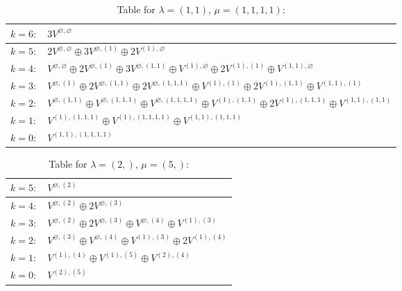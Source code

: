 \documentclass[a4paper,12pt]{article}
\begin{document}
\renewcommand{\arraystretch}{1.6} 
\begin{table}[H]
\centering
\caption{Table for $\lambda = (1, 1)$, $\mu = (1, 1, 1, 1)$:}
\begin{tabular}{|>{\centering\arraybackslash}p{15cm}|}
\hline
 $k = 6: \quad 3 V^{\varnothing, \varnothing} $ \\ \hline
 $k = 5: \quad 2 V^{\varnothing, \varnothing} \oplus 3 V^{\varnothing, (1)} \oplus 2 V^{(1), \varnothing} $ \\ \hline
 $k = 4: \quad V^{\varnothing, \varnothing} \oplus 2 V^{\varnothing, (1)} \oplus 3 V^{\varnothing, (1, 1)} \oplus V^{(1), \varnothing} \oplus 2 V^{(1), (1)} \oplus V^{(1, 1), \varnothing} $ \\ \hline
 $k = 3: \quad V^{\varnothing, (1)} \oplus 2 V^{\varnothing, (1, 1)} \oplus 2 V^{\varnothing, (1, 1, 1)} \oplus V^{(1), (1)} \oplus 2 V^{(1), (1, 1)} \oplus V^{(1, 1), (1)} $ \\ \hline
 $k = 2: \quad V^{\varnothing, (1, 1)} \oplus V^{\varnothing, (1, 1, 1)} \oplus V^{\varnothing, (1, 1, 1, 1)} \oplus V^{(1), (1, 1)} \oplus 2 V^{(1), (1, 1, 1)} \oplus V^{(1, 1), (1, 1)} $ \\ \hline
 $k = 1: \quad V^{(1), (1, 1, 1)} \oplus V^{(1), (1, 1, 1, 1)} \oplus V^{(1, 1), (1, 1, 1)} $ \\ \hline
 $k = 0: \quad V^{(1, 1), (1, 1, 1, 1)} $ \\ \hline
\end{tabular}
\end{table}

\renewcommand{\arraystretch}{1.6} 
\begin{table}[H]
\centering
\caption{Table for $\lambda = (2,)$, $\mu = (5,)$:}
\begin{tabular}{|>{\centering\arraybackslash}p{15cm}|}
\hline
 $k = 5: \quad V^{\varnothing, (2)} $ \\ \hline
 $k = 4: \quad V^{\varnothing, (2)} \oplus 2 V^{\varnothing, (3)} $ \\ \hline
 $k = 3: \quad V^{\varnothing, (2)} \oplus 2 V^{\varnothing, (3)} \oplus V^{\varnothing, (4)} \oplus V^{(1), (3)} $ \\ \hline
 $k = 2: \quad V^{\varnothing, (3)} \oplus V^{\varnothing, (4)} \oplus V^{(1), (3)} \oplus 2 V^{(1), (4)} $ \\ \hline
 $k = 1: \quad V^{(1), (4)} \oplus V^{(1), (5)} \oplus V^{(2), (4)} $ \\ \hline
 $k = 0: \quad V^{(2), (5)} $ \\ \hline
\end{tabular}
\end{table}
\end{document}
